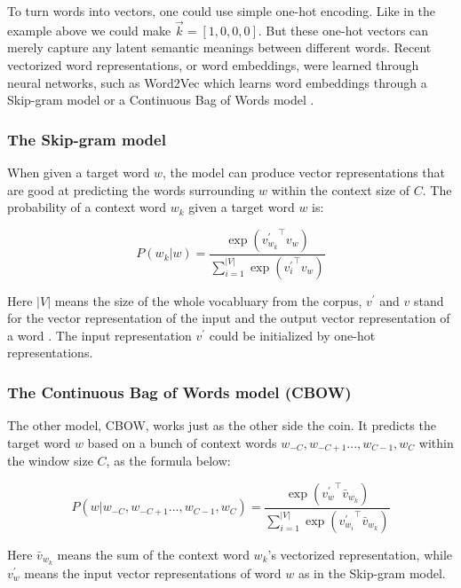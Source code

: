 \documentclass[thesis,fonts=libertine]{cluu}
\begin{document}
To turn words into vectors, one could use simple one-hot encoding. Like in the example above we could make $\vec{k}=[1, 0, 0, 0]$. But these one-hot vectors can merely capture any latent semantic meanings between different words. Recent vectorized word representations, or word embeddings, were learned through neural networks, such as Word2Vec which learns word embeddings through a Skip-gram model or a Continuous Bag of Words model \parencite{Mikolov:2013ab}.

\subsubsection{The Skip-gram model}

When given a target word $w$, the model can produce vector representations that are good at predicting the words surrounding $w$ within the context size of $C$. The probability of a context word $w_k$ given a target word $w$ is:

\begin{equation}
  P(w_k|w)=\frac{\exp({v_{w_k}^\prime}^\intercal v_w)}{\sum_{i=1}^{|V|}\exp({v^\prime_i}^\intercal v_w)}
\end{equation}

Here $|V|$ means the size of the whole vocabluary from the corpus, $v^\prime$ and $v$ stand for the vector representation of the input and the output vector representation of a word \parencite{Mikolov:2013aa}. The input representation $v^\prime$ could be initialized by one-hot representations.

\subsubsection{The Continuous Bag of Words model (CBOW)}

The other model, CBOW, works just as the other side the coin. It predicts the target word $w$ based on a bunch of context words $w_{-C}, w_{-C+1} ..., w_{C-1}, w_C$ within the window size $C$, as the formula below:

\begin{equation}
  P(w|w_{-C}, w_{-C+1} ..., w_{C-1}, w_C)=\frac{\exp({v^\prime_w}^\intercal \bar{v}_{w_k})}{\sum^{|V|}_{i=1}\exp({v^\prime_{w_i}}^\intercal \bar{v}_{w_k})}
\end{equation}

Here $\bar{v}_{w_k}$ means the sum of the context word $w_k$'s vectorized representation, while $v^\prime_w$ means the input vector representations of word $w$ as in the Skip-gram model. 
\end{document}

